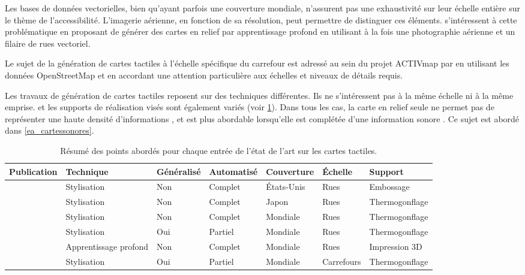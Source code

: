 \newpar{}

Les bases de données vectorielles, bien qu'ayant parfois une couverture mondiale, n'assurent pas une exhaustivité sur leur échelle entière sur le thème de l'accessibilité. L'imagerie aérienne, en fonction de sa résolution, peut permettre de distinguer ces éléments. \cite{FillieresRiveau2020} s'intéressent à cette problématique en proposant de générer des cartes en relief par apprentissage profond en utilisant à la fois une photographie aérienne et un filaire de rues vectoriel. 

\newpar{}

Le sujet de la génération de cartes tactiles à l'échelle spécifique du carrefour est adressé au sein du projet ACTIVmap par \cite{Jiang2023} en utilisant les données OpenStreetMap et en accordant une attention particulière aux échelles et niveaux de détails requis.

Les travaux de génération de cartes tactiles reposent sur des techniques différentes. Ils ne s'intéressent pas à la même échelle ni à la même emprise. et les supports de réalisation visés sont également variés (voir \ref{tab:ea_relief}). Dans tous les cas, la carte en relief seule ne permet pas de représenter une haute densité d'informations \cite{Touya2019}, et est plus abordable lorsqu'elle est complétée d'une information sonore \cite{Brock2015}. Ce sujet est abordé dans \ref{ea_cartessonores}.

\begin{table}
\begin{center}
\scriptsize
\begin{tabular}{ | l | l | l | l | l | l | l | }
    Publication & Technique & Généralisé & Automatisé & Couverture & Échelle & Support \tabularnewline
    \hline
    \cite{Miele2004} & Stylisation & Non & Complet & États-Unis & Rues & Embossage \tabularnewline
    \cite{Minatani2010} & Stylisation & Non & Complet & Japon & Rues & Thermogonflage \tabularnewline
    \cite{Watanabe2014, Cervenka2016} & Stylisation & Non & Complet & Mondiale & Rues & Thermogonflage \tabularnewline
    \cite{Stampach2016} & Stylisation & Oui & Partiel & Mondiale & Rues & Thermogonflage \tabularnewline
    \cite{FillieresRiveau2020} & Apprentissage profond & Non & Complet & Mondiale & Rues & Impression 3D \tabularnewline
    \cite{Jiang2023} & Stylisation & Oui & Partiel & Mondiale & Carrefours & Thermogonflage \tabularnewline
\end{tabular}
\end{center}
\caption{Résumé des points abordés pour chaque entrée de l'état de l'art sur les cartes tactiles.}
\label{tab:ea_relief}
\end{table}

